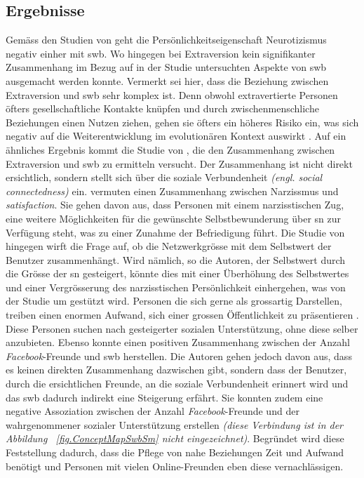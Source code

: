 \subsection{Ergebnisse}\label{subsec.traitsErgebnisse}
Gemäss den Studien von  geht die Persönlichkeitseigenschaft Neurotizismus negativ einher mit \gls{swb}. Wo hingegen bei Extraversion kein signifikanter Zusammenhang im Bezug auf in der Studie untersuchten Aspekte von \gls{swb} ausgemacht werden konnte. Vermerkt sei hier, dass die Beziehung zwischen Extraversion und \gls{swb} sehr komplex ist. Denn obwohl extravertierte Personen öfters gesellschaftliche Kontakte knüpfen und durch zwischenmenschliche Beziehungen einen Nutzen ziehen, gehen sie öfters ein höheres Risiko ein, was sich negativ auf die Weiterentwicklung im evolutionären Kontext auswirkt \cite{Nettle:2005}. Auf ein ähnliches Ergebnis kommt die Studie von , die den Zusammenhang zwischen Extraversion und \gls{swb} zu ermitteln versucht. Der Zusammenhang ist nicht direkt ersichtlich, sondern stellt sich über die soziale Verbundenheit \textit{(engl. social connectedness)} ein.\newline
{} vermuten einen Zusammenhang zwischen Narzissmus und \textit{satisfaction}. Sie gehen davon aus, dass Personen mit einem narzisstischen Zug, eine weitere Möglichkeiten  für die gewünschte Selbstbewunderung über \gls{sn} zur Verfügung steht, was zu einer Zunahme der Befriedigung führt. Die Studie von  hingegen wirft die Frage auf, ob die Netzwerkgrösse mit dem Selbstwert der Benutzer zusammenhängt. Wird nämlich, so die Autoren, der Selbstwert durch die Grösse der \gls{sn} gesteigert, könnte dies mit einer Überhöhung des Selbstwertes und einer Vergrösserung des narzisstischen Persönlichkeit einhergehen, was von der Studie um  gestützt wird. Personen die sich gerne als grossartig Darstellen, treiben einen enormen Aufwand, sich einer grossen Öffentlichkeit zu präsentieren \cite{Carpenter:2012}. Diese Personen suchen nach gesteigerter sozialen Unterstützung, ohne diese selber anzubieten. \newline
Ebenso konnte  einen positiven Zusammenhang zwischen der Anzahl \textit{Facebook}-Freunde und \gls{swb} herstellen. Die Autoren gehen jedoch davon aus, dass es keinen direkten Zusammenhang dazwischen gibt, sondern dass der Benutzer, durch die ersichtlichen Freunde, an die soziale Verbundenheit erinnert wird und das \gls{swb} dadurch indirekt eine Steigerung erfährt. Sie konnten zudem eine negative Assoziation zwischen der Anzahl \textit{Facebook}-Freunde und der wahrgenommener sozialer Unterstützung erstellen \textit{(diese Verbindung ist in der Abbildung ~\ref{fig.ConceptMapSwbSm} nicht eingezeichnet)}. Begründet wird diese Feststellung dadurch, dass  die Pflege von nahe Beziehungen Zeit und Aufwand benötigt und Personen mit vielen Online-Freunden eben diese vernachlässigen.\newline
